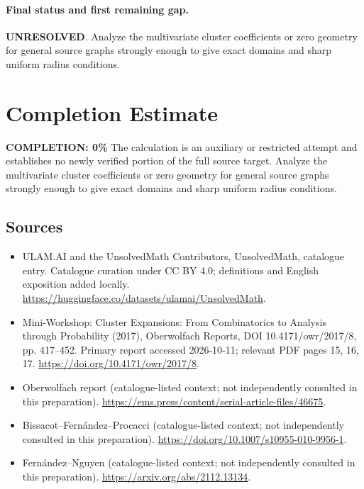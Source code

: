 \documentclass[11pt]{article}
\begin{document}
\paragraph{Final status and first remaining gap.}
\textbf{UNRESOLVED}. Analyze the multivariate cluster coefficients or zero geometry for general source graphs strongly enough to give exact domains and sharp uniform radius conditions.

\section{Completion Estimate}
\noindent\textbf{COMPLETION: 0\%}
The calculation is an auxiliary or restricted attempt and establishes no newly verified portion of the full source target. Analyze the multivariate cluster coefficients or zero geometry for general source graphs strongly enough to give exact domains and sharp uniform radius conditions.

\subsection{Sources}
\begin{itemize}
\item[\hypertarget{source:statement:1}{S1}] ULAM.AI and the UnsolvedMath Contributors, UnsolvedMath, catalogue entry. Catalogue curation under CC BY 4.0; definitions and English exposition added locally.
\url{https://huggingface.co/datasets/ulamai/UnsolvedMath}.
\item[\hypertarget{source:statement:2}{S2}] Mini-Workshop: Cluster Expansions: From Combinatorics to Analysis through Probability (2017), Oberwolfach Reports, DOI 10.4171/owr/2017/8, pp. 417--452. Primary report accessed 2026-10-11; relevant PDF pages 15, 16, 17.
\url{https://doi.org/10.4171/owr/2017/8}.
\item[\hypertarget{source:statement:3}{S3}] Oberwolfach report (catalogue-listed context; not independently consulted in this preparation).
\url{https://ems.press/content/serial-article-files/46675}.
\item[\hypertarget{source:statement:4}{S4}] Bissacot--Fernández--Procacci (catalogue-listed context; not independently consulted in this preparation).
\url{https://doi.org/10.1007/s10955-010-9956-1}.
\item[\hypertarget{source:statement:5}{S5}] Fernández--Nguyen (catalogue-listed context; not independently consulted in this preparation).
\url{https://arxiv.org/abs/2112.13134}.
\end{itemize}
\label{end:statement}
\end{document}
